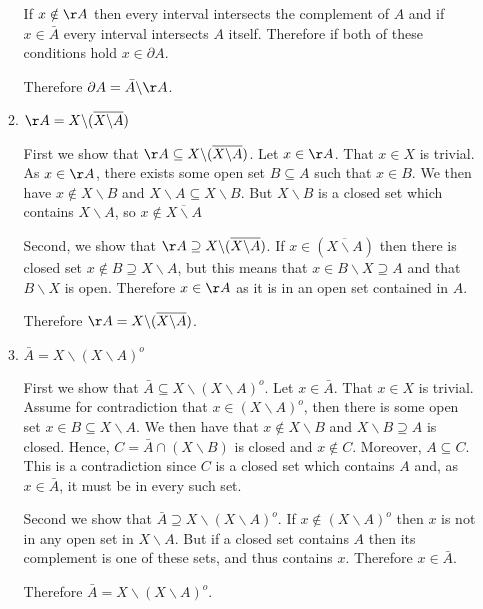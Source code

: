 \documentclass[11pt]{article}
\begin{document}
\begin{enumerate}
\begin{enumerate}
If $x \notin \AA$ then every interval intersects the complement of $A$ and if $x \in \bar{A}$ every interval intersects $A$ itself.  Therefore if both of these conditions hold $x \in \partial A$.

Therefore $\partial A = \bar{A} \backslash \AA$.

\item \emph{$\AA = X \backslash (\overline{X \backslash A})$}

First we show that $\AA \subseteq X \backslash (\overline{X \backslash A})$.  Let $x \in \AA$.  That $x \in X$ is trivial.  As $x \in \AA$, there exists some open set $B \subseteq A$ such that $x \in B$.  We then have $x \notin X \backslash B$ and $X \backslash A \subseteq X \backslash B$.  But $X \backslash B$ is a closed set which contains $X \backslash A$, so $x \notin \overline{X \backslash A}$

Second, we show that $\AA \supseteq X \backslash (\overline{X \backslash A})$.  If $x \in (\overline{X \backslash A})$ then there is closed set $x \notin B \supseteq X \backslash A$, but this means that $x \in B \backslash X \supseteq A$ and that $B \backslash X$ is open.  Therefore $x \in \AA$ as it is in an open set contained in $A$.

Therefore $\AA = X \backslash (\overline{X \backslash A})$.

\item \emph{$\bar{A} = X \backslash (X \backslash A)^o$}

First we show that $\bar{A} \subseteq X \backslash (X \backslash A)^o$.  Let $x \in \bar{A}$.  That $x \in X$ is trivial.  Assume for contradiction that $x \in (X \backslash A)^o$, then there is some open set $x \in B \subseteq X \backslash A$.  We then have that $x \notin X \backslash B$ and $X \backslash B \supseteq A$ is closed.  Hence, $C = \bar{A} \cap (X \backslash B)$ is closed and $x \notin C$.  Moreover, $A \subseteq C$.  This is a contradiction since $C$ is a closed set which contains $A$ and, as $x \in \bar{A}$, it must be in every such set.

Second we show that $\bar{A} \supseteq X \backslash (X \backslash A)^o$.  If $x \notin (X \backslash A)^o$ then $x$ is not in any open set in $X \backslash A$.  But if a closed set contains $A$ then its complement is one of these sets, and thus contains $x$.  Therefore $x \in \bar{A}$.

Therefore $\bar{A} = X \backslash (X \backslash A)^o$.
\end{enumerate}


\end{enumerate}
\end{document}
